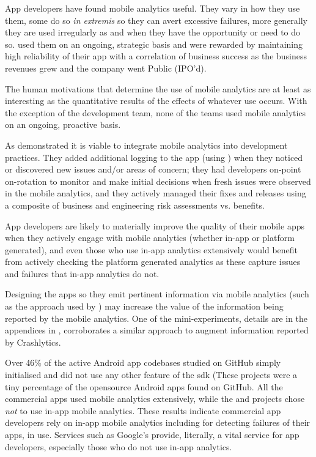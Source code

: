  App developers have found mobile analytics useful. They vary in how they use them, some do so \emph{in extremis} so they can avert excessive failures, more generally they are used irregularly as and when they have the opportunity or need to do so.  used them on an ongoing, strategic basis and were rewarded by maintaining high reliability of their app with a correlation of business success as the business revenues grew and the company went Public (IPO'd). 

The human motivations that determine the use of mobile analytics are at least as interesting as the quantitative results of the effects of whatever use occurs. With the exception of the  development team, none of the teams used mobile analytics on an ongoing, proactive basis. 

As  demonstrated it is viable to integrate mobile analytics into development practices. They added additional logging to the app (using ) when they noticed or discovered new issues and/or areas of concern; they had developers on-point on-rotation to monitor and make initial decisions when fresh issues were observed in the mobile analytics, and they actively managed their fixes and releases using a composite of business and engineering risk assessments vs. benefits.

App developers are likely to materially improve the quality of their mobile apps when they actively engage with mobile analytics (whether in-app or platform generated), and even those who use in-app analytics extensively would benefit from actively checking the platform generated analytics as these capture issues and failures that in-app analytics do not.

Designing the apps so they emit pertinent information via mobile analytics (such as the approach used by ) may increase the value of the information being reported by the mobile analytics. One of the mini-experiments, details are in the appendices in , corroborates a  similar approach to augment information reported by Crashlytics. 


Over 46\% of the active Android app codebases studied on GitHub simply initialised  and did not use any other feature of the \Gls{sdk} (These projects were a tiny percentage of the opensource Android apps found on GitHub. All the commercial apps used mobile analytics extensively, while the  and  projects chose \emph{not} to use in-app mobile analytics. These results indicate commercial app developers rely on in-app mobile analytics including for detecting failures of their apps, in use. Services such as Google's  provide, literally, a vital service for app developers, especially those who do not use in-app analytics.

